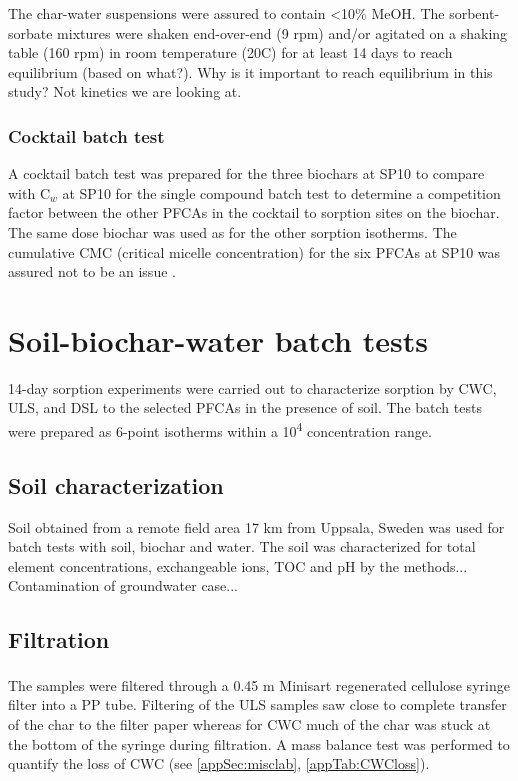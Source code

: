 The char-water suspensions were assured to contain \textless 10\% MeOH. The sorbent-sorbate mixtures were shaken end-over-end (9 rpm) and/or agitated on a shaking table (160 rpm) in room temperature (20\textdegree C) for at least 14 days to reach equilibrium (based on what?). Why is it important to reach equilibrium in this study? Not kinetics we are looking at. 

\subsubsection{Cocktail batch test}
A cocktail batch test was prepared for the three biochars at SP10 to compare with C$_w$ at SP10 for the single compound batch test to determine a competition factor between the other PFCAs in the cocktail to sorption sites on the biochar. The same dose biochar was used as for the other sorption isotherms. The cumulative CMC (critical micelle concentration) for the six PFCAs at SP10 was assured not to be an issue \citep{bhhatarai2011}. 

\section{Soil-biochar-water batch tests}
14-day sorption experiments were carried out to characterize sorption by CWC, ULS, and DSL to the selected PFCAs in the presence of soil. The batch tests were prepared as 6-point isotherms within a 10\textsuperscript{4} concentration range. 

\subsection{Soil characterization}
Soil obtained from a remote field area 17 km from Uppsala, Sweden was used for batch tests with soil, biochar and water. The soil was characterized for total element concentrations, exchangeable ions, TOC and pH by the methods... Contamination of groundwater case...

\subsection{Filtration}
The samples were filtered through a 0.45 \textmu m Minisart\textsuperscript{\textregistered} regenerated cellulose syringe filter into a PP tube. Filtering of the ULS samples saw close to complete transfer of the char to the filter paper whereas for CWC much of the char was stuck at the bottom of the syringe during filtration. A mass balance test was performed to quantify the loss of CWC (see \cref{appSec:misclab}, \cref{appTab:CWCloss}).

